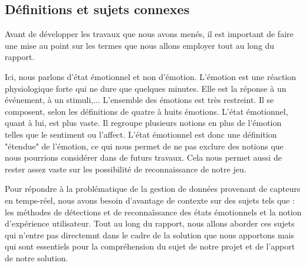 \documentclass{article}
\begin{document}
	\subsection{Définitions et sujets connexes}\label{sec:connexe}
		Avant de développer les travaux que nous avons menés, il est important de faire une mise au point sur les termes que nous allons employer tout au long du rapport.\par
		Ici, nous parlons d'état émotionnel et non d'émotion.
		L'émotion est une réaction physiologique forte qui ne dure que quelques minutes.
		Elle est la réponse à un événement, à un stimuli,...
		L'ensemble des émotions est très restreint.
		Il se composent, selon les définitions de quatre à huits émotions.
		L'état émotionnel, quant à lui, est plus vaste. 
		Il regroupe plusieurs notions en plus de l'émotion telles que le sentiment ou l'affect. 
		L'état émotionnel est donc une définition "étendue" de l'émotion, ce qui nous permet de ne pas exclure des notions que nous pourrions considérer dans de futurs travaux.
		Cela nous permet aussi de rester assez vaste sur les possibilité de reconnaissance de notre jeu.\par
		Pour répondre à la problématique de la gestion de données provenant de capteurs en temps-réel, nous avons besoin d'avantage de contexte sur des sujets tels que : les méthodes de détections et de reconnaîssance des états émotionnels et la notion d'expérience utilisateur.
		Tout au long du rapport, nous allons aborder ces sujets qui n'entre pas directemnt dans le cadre de la solution que nous apportons mais qui sont essentiels pour la compréhension du sujet de notre projet et de l'apport de notre solution.
\end{document}
